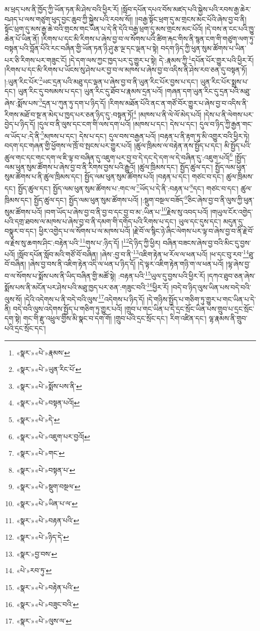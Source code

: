 མ་ཕྲད་པས་ནི་ཁྱོད་ཀྱི་ཡོན་ཏན་མི་ཤེས་བའི་ཕྱིར་རོ། །སློབ་དཔོན་དཔའ་བོས་མཛད་པའི་སྐྱེས་པའི་རབས་རྒྱ་ཆེར་བཤད་པ་ལས་གཙུག་ཕུད་བྱང་ཆུབ་ཀྱི་སྐྱེས་པའི་རབས་སོ།། །།བརྒྱ་སྟོང་ཕྲག་དུ་མ་གྲངས་མང་པོའི་ཞེས་བྱ་བ་ནི། སྟོང་ཕྲག་དུ་མས་རྒྱ་ཆེ་བའི་གྲངས་གང་ཡིན་པ་དེ་ནི་དེའི་བརྒྱ་ཕྲག་དུ་མས་གྲངས་མང་པོའོ། །དེ་བས་ན་ངང་པའི་ཁྱུ་ཆེན་པོ་ཡིན་ནོ། །རིགས་པ་དང་མི་རིགས་པ་ཞེས་བྱ་བ་ལ་སོགས་པའི་ཚིག་རྐང་གིས་ནི་སྙན་ངག་གི་གཙུག་ལག་ཏུ་བསྟན་པའི་བློན་པོའི་རང་བཞིན་གྱི་ཡོན་ཏན་ཉི་ཤུ་རྩ་ལྔ་དང་ལྡན་པ་སྟེ། བདག་ཉིད་ཀྱི་ཕུན་སུམ་ཚོགས་པ་ཡིན་པར་ཅི་རིགས་པར་གཟུང་ངོ། །དེ་དག་ལས་ཀྱང་ཁྱད་པར་དུ་གྱུར་པ་སྟེ། དེ་:རྣམས་ཀྱི་\footnote{«སྣར་»«པེ་»རྣམས་}དཔོན་པོར་གྱུར་པའི་ཕྱིར་རོ། །རིགས་པ་དང་མི་རིགས་པ་ཡོངས་སུ་ཤེས་པར་བྱ་བ་ལ་མཁས་པ་ཞེས་བྱ་བ་འདིས་ནི་ཤེས་རབ་ཅན་དུ་བསྟན་ཏོ། །:ཡུན་རིང་པོར་\footnote{«སྣར་»«པེ་»ཡུན་རིང་པོ་}ཡང་དྲན་པའི་མཐུ་དང་ལྡན་པ་ཞེས་བྱ་བ་ནི་ཡུན་རིང་པོར་བྱས་པ་དང་། ཡུན་རིང་པོར་སྨྲས་པ་དང་། ཡུན་རིང་དུ་བསམས་པ་དང་། ཡུན་རིང་དུ་ཐོབ་པ་རྣམས་དྲན་པའོ། །གཞན་དག་ཡུན་རིང་དུ་དྲན་པའི་མཐུ་ཞེས་:སྨོས་པས་\footnote{«སྣར་»«པེ་»སྨོས་པས་ནི་}དྲན་པ་ཀུན་ཏུ་དག་པ་ཉིད་དོ། །རིགས་མཐོན་པོའི་ནང་ན་གཙོ་བོར་གྱུར་པ་ཞེས་བྱ་བ་འདིས་ནི་རིགས་མཐོ་བ་སྔ་ན་མེད་པ་ཁྱད་པར་ཅན་ཉིད་དུ་:བསྟན་ཏོ།\footnote{«སྣར་»«པེ་»བསྟན་པའོ།} །མཁས་པ་ནི་ལེ་ལོ་མེད་པའོ། །དེས་པ་ནི་ལེགས་པར་བྱེད་པ་ཉིད་དོ། །དུལ་བ་ནི་ལུས་དང་ངག་གི་ལས་དག་པའོ། །མཁས་པ་དང་། དེས་པ་དང་། དུལ་བ་ཉིད་ཀྱི་རྒྱན་གང་ལ་ཡོད་པ་:དེ་ནི་\footnote{«སྣར་»«པེ་»དེ་}མཁས་པ་དང་། དེས་པ་དང་། དུལ་བས་བརྒྱན་པའོ། །བརྟན་པ་ནི་རྟག་ཏུ་མི་འགྱུར་བའི་ཕྱིར་ཏེ། བདག་དང་གཞན་གྱི་ཕྱོགས་ལ་ཁྲོ་བ་སྤངས་པར་གྱུར་པའོ། །ཚུལ་ཁྲིམས་ལ་བརྟེན་ནས་སྤྱོད་པ་དང་། མི་སྤྱོད་པའི་ཚུལ་གང་དང་གང་དག་ལ་ཇི་ལྟ་བ་བཞིན་དུ་འཇུག་པར་བྱ་བ་དེ་དང་དེ་དག་ལ་དེ་བཞིན་དུ་:འཇུག་པའོ།\footnote{«སྣར་»«པེ་»འཇུག་པར་བྱའོ།} །སྤྱོད་ལམ་ཕུན་སུམ་ཚོགས་པ་ཞེས་བྱ་བ་ནི་རིགས་བྱས་པའི་རྒྱུའོ། །ཚུལ་ཁྲིམས་དང་། སྤྱོད་ཚུལ་དང་། སྤྱོད་ལམ་ཕུན་སུམ་ཚོགས་པ་ནི་ཚུལ་ཁྲིམས་དང་། སྤྱོད་ལམ་ཕུན་སུམ་ཚོགས་པའོ། །བརྟན་པ་དང་། གཙང་བ་དང་། ཚུལ་ཁྲིམས་དང་། སྤྱོད་ཚུལ་དང་། སྤྱོད་ལམ་ཕུན་སུམ་ཚོགས་པ་:གང་ལ་\footnote{«སྣར་»«པེ་»གང་}ཡོད་པ་དེ་ནི་:བརྟན་པ་\footnote{«སྣར་»«པེ་»བསྟན་པ་}དང་། གཙང་བ་དང་། ཚུལ་ཁྲིམས་དང་། སྤྱོད་ཚུལ་དང་། སྤྱོད་ལམ་ཕུན་སུམ་ཚོགས་པའོ། །:སྡུག་བསྔལ་བཟོད་\footnote{«སྣར་»«པེ་»སྡུག་བསྔལ་}ཅིང་ཞེས་བྱ་བ་ནི་ལུས་ཀྱི་ཕུན་སུམ་ཚོགས་པའོ། །བག་ཡོད་པ་ཞེས་བྱ་བ་ནི་བྱ་བ་དང་བྱ་བ་མ་:ཡིན་པ་\footnote{«སྣར་»«པེ་»ཡིན་པ་ལ་}རྗེས་སུ་འབད་པའོ། །གཡུལ་ངོར་འགྱེད་པའི་དགྲ་ཐབས་ལ་མཁས་པ་ཞེས་བྱ་བ་ནི་དམག་གི་དགོད་པའི་རིགས་པ་དང་། ཡུལ་དང་དུས་དང་། མདུན་དུ་བསྣུར་བ་དང་། ཕྱིར་འགྱེད་པ་ལ་སོགས་པ་ལ་མཁས་པའོ། །རྗེ་བོ་ལ་སྙིང་ཉེ་ཞིང་ལེགས་པར་ལྟ་བ་ཞེས་བྱ་བ་ནི་རྗེ་བོ་ལ་རྗེས་སུ་ཆགས་ཤིང་:བརྟེན་པའི་\footnote{«སྣར་»«པེ་»བརྟན་པའི་}གུས་པ་:ཉིད་དོ། །\footnote{«སྣར་»«པེ་»ཉིད་དེ་}དེ་ཉིད་ཀྱི་ཕྱིར། བཞིན་བཟངས་ཞེས་བྱ་བའི་མིང་དུ་བྱས་པའོ། །སློབ་དཔོན་སློབ་མའི་གཙོ་བོ་བཞིན། །ཞེས་:བྱ་བ་ནི་\footnote{«སྣར་»བྱ་བས་}འཇིག་རྟེན་ཕ་རོལ་ལ་ཕན་པའོ། །ཕ་དང་བུ་རབ་\footnote{«པེ་»རབ་ཏུ་}ཐུ་བོ་བཞིན། །ཞེས་བྱ་བས་ནི་འཇིག་རྟེན་འདི་ལ་ཕན་པ་ཉིད་དོ། །དེ་ལྟར་འཇིག་རྟེན་གཉི་ག་ལ་ཕན་པའོ། །ལྷ་ཞེས་བྱ་བ་ལ་སོགས་པ་སྨོས་པས་ནི་ཡིད་བཞིན་གྱི་མཚོ་སྟེ། :བརྟན་པའི་\footnote{«སྣར་»«པེ་»བརྟེན་པའི་}ཡུལ་དུ་བྱས་པའི་ཕྱིར་རོ། །དཀའ་ཐུབ་ཅན་ཞེས་སྨོས་པས་ནི་མངོན་པར་ཤེས་པའི་མཐུ་ཁྱད་པར་ཅན་:གཟུང་བའི་\footnote{«སྣར་»«པེ་»བཟུང་བའི་}ཕྱིར་རོ། །བདེ་བ་ཉིད་ལུས་ཡིན་པས་བདེ་བའི་ལུས་སོ། །དེའི་འདེགས་པ་ནི་བདེ་བའི་ལུས་\footnote{«སྣར་»«པེ་»ལུས་ལ་}འདེགས་པ་ཉིད་དོ། །དེ་གཉིས་སྤྱོད་པ་གཅིག་ཏུ་གྱུར་པ་གང་ཡིན་པ་དེ་ནི། བདེ་བའི་ལུས་འདེགས་སྤྱོད་པ་གཅིག་ཏུ་གྱུར་པའོ། །གྲུབ་པ་གང་ཡིན་པ་དེ་དྲང་སྲོང་ཡིན་པས་གྲུབ་པ་དྲང་སྲོང་དག་སྟེ། གང་གི་རྫུ་འཕྲུལ་གྱིས་མི་སྣང་བ་དག་གོ། །གྲུབ་པའི་དྲང་སྲོང་དང་། རིག་འཛིན་དང་། ལྷ་རྣམས་ནི་གྲུབ་པའི་དྲང་སྲོང་དང་། 